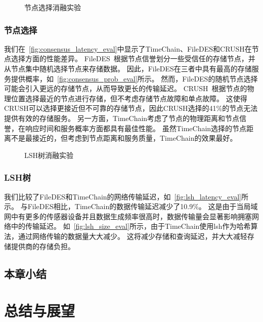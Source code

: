 \begin{figure*}[t]
    \centering
    \begin{minipage}{0.8\linewidth}
        \vspace{0.5ex}
        \caption{节点选择消融实验} 
    \end{minipage}
\end{figure*}

\subsection{节点选择}
我们在~\autoref{fig:consensus_latency_eval}中显示了TimeChain、FileDES和CRUSH在节点选择方面的性能差异。
FileDES~\cite{xu2024filedes}根据节点信誉划分一些受信任的存储节点，并从节点集中随机选择节点来存储数据。
因此，FileDES在三者中具有最高的存储服务提供概率，如~\autoref{fig:consensus_prob_eval}所示。
然而，FileDES的随机节点选择可能会引入更远的存储节点，从而导致更长的传输延迟。
CRUSH~\cite{weil2006ceph}根据节点的物理位置选择最近的节点进行存储，但不考虑存储节点故障和单点故障。
这使得CRUSH可以选择更接近但不可靠的存储节点，因此CRUSH选择的41\%的节点无法提供有效的存储服务。
另一方面，TimeChain考虑了节点的物理距离和节点信誉，在响应时间和服务概率方面都具有最佳性能。
虽然TimeChain选择的节点距离不是最接近的，但考虑到节点距离和服务质量，TimeChain的效果最好。

\begin{figure*}[t]
    \centering
    \begin{minipage}{0.8\linewidth}
        \vspace{-0.5ex}
        \caption{LSH树消融实验} 
    \end{minipage}
\end{figure*}

\subsection{LSH树}
我们比较了FileDES和TimeChain的网络传输延迟，如~\autoref{fig:lsh_latency_eval}所示。
与FileDES相比，TimeChain的数据传输延迟减少了10.9\%。
这是由于当局域网中有更多的传感器设备并且数据生成频率很高时，数据传输量会显著影响拥塞网络中的传输延迟。
如~\autoref{fig:lsh_size_eval}所示，由于TimeChain使用lsh作为哈希算法，通过网络传输的数据量大大减少。
这将减少存储和查询延迟，并大大减轻存储提供商的存储负担。

\section{本章小结}


\chapter{总结与展望}

